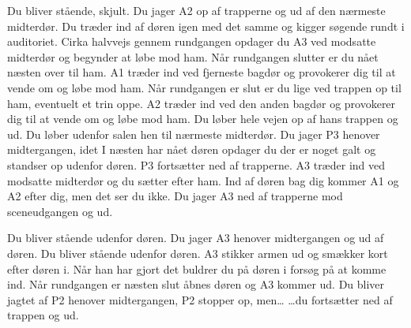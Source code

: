 \documentclass[a4paper,11pt]{article}
\begin{document}
\begin{sketch}
\newpage
{}


 Du bliver stående, skjult.
 Du jager A2 op af trapperne og ud af den nærmeste midterdør.
 Du træder ind af døren igen med det samme og kigger søgende rundt i auditoriet. Cirka halvvejs gennem rundgangen opdager du A3 ved modsatte midterdør og begynder at løbe mod ham. Når rundgangen slutter er du nået næsten over til ham.
 A1 træder ind ved fjerneste bagdør og provokerer dig til at vende om og løbe mod ham. Når rundgangen er slut er du lige ved trappen op til ham, eventuelt et trin oppe.
 A2 træder ind ved den anden bagdør og provokerer dig til at vende om og løbe mod ham. Du løber hele vejen op af hans trappen og ud.
 Du løber udenfor salen hen til nærmeste midterdør.
 Du jager P3 henover midtergangen, idet I næsten har nået døren opdager du der er noget galt og standser op udenfor døren. P3 fortsætter ned af trapperne.
 A3 træder ind ved modsatte midterdør og du sætter efter ham. Ind af døren bag dig kommer A1 og A2 efter dig, men det ser du ikke.
 Du jager A3 ned af trapperne mod sceneudgangen og ud.


\newpage
{}


 Du bliver stående udenfor døren.
 Du jager A3 henover midtergangen og ud af døren.
 Du bliver stående udenfor døren.
 A3 stikker armen ud og smækker kort efter døren i. Når han har gjort det buldrer du på døren i forsøg på at komme ind. Når rundgangen er næsten slut åbnes døren og A3 kommer ud.
 Du bliver jagtet af P2 henover midtergangen, P2 stopper op, men\dots{}
 \dots{}du fortsætter ned af trappen og ud.


\end{sketch}
\end{document}
